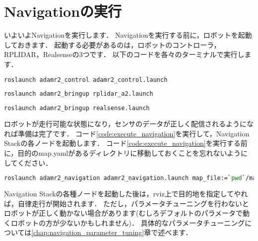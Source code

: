\documentclass[{../../master}]{subfiles}
\begin{document}
\section{Navigationの実行}

いよいよNavigationを実行します．
Navigationを実行する前に，ロボットを起動しておきます．
起動する必要があるのは，ロボットのコントローラ，RPLIDAR，Realsenseの3つです．
以下のコードを各々のターミナルで実行します．

\begin{lstlisting}[language=sh]
roslaunch adamr2_control adamr2_control.launch
\end{lstlisting}

\begin{lstlisting}[language=sh]
roslaunch adamr2_bringup rplidar_a2.launch
\end{lstlisting}

\begin{lstlisting}[language=sh]
roslaunch adamr2_bringup realsense.launch
\end{lstlisting}

ロボットが走行可能な状態になり，センサのデータが正しく配信されるようになれば準備は完了です．
コード\ref{code:execute_navigation}を実行して，Navigation Stackの各ノードを起動します．
コード\ref{code:execute_navigation}を実行する前に，目的の\textsf{map.yaml}があるディレクトリに移動しておくことを忘れないようにしてください．

\begin{lstlisting}[language=sh, label=code:execute_navigation, caption=Execute Navigation]
roslaunch adamr2_navigation adamr2_navigation.launch map_file:=`pwd`/map.yaml
\end{lstlisting}

Navigation Stackの各種ノードを起動した後は，\textsf{rviz}上で目的地を指定してやれば，自律走行が開始されます．
ただし，パラメータチューニングを行わないとロボットが正しく動かない場合があります(むしろデフォルトのパラメータで動くロボットの方が少ないかもしれません)．
具体的なパラメータチューニングについては\ref{chap:navigation_parameter_tuning}章で述べます．
\end{document}
